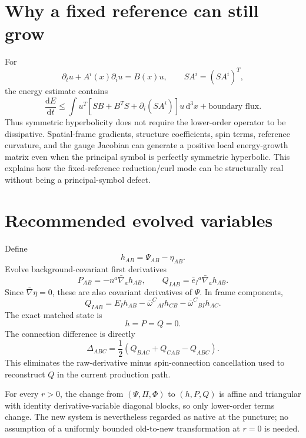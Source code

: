 \documentclass[11pt]{article}
\newcommand{\bn}{\bar\nabla}
\newcommand{\be}{\bar e}
\newcommand{\bw}{\bar\omega}
\newcommand{\dd}{\mathrm d}
\begin{document}
\section{Why a fixed reference can still grow}
For
\[
\partial_tu+A^i(x)\partial_i u=B(x)u,\qquad SA^i=(SA^i)^T,
\]
the energy estimate contains
\begin{equation}
\frac{\dd E}{\dd t}\le
\int u^T\left[SB+B^TS+\partial_i(SA^i)\right]u\,\dd^3x+\text{boundary flux}.
\label{eq:energy}
\end{equation}
Thus symmetric hyperbolicity does not require the lower-order operator to be dissipative. Spatial-frame gradients, structure coefficients, spin terms, reference curvature, and the gauge Jacobian can generate a positive local energy-growth matrix even when the principal symbol is perfectly symmetric hyperbolic. This explains how the fixed-reference reduction/curl mode can be structurally real without being a principal-symbol defect.

\section{Recommended evolved variables}
Define
\begin{equation}
\boxed{h_{AB}=\Psi_{AB}-\eta_{AB}.}
\end{equation}
Evolve background-covariant first derivatives
\begin{equation}
\boxed{P_{AB}=-n^a\bn_a h_{AB},\qquad Q_{IAB}=\be_I{}^a\bn_a h_{AB}.}
\label{eq:variables}
\end{equation}
Since $\bn\eta=0$, these are also covariant derivatives of $\Psi$. In frame components,
\begin{equation}
Q_{IAB}=E_Ih_{AB}-\bw^C{}_{AI}h_{CB}-\bw^C{}_{BI}h_{AC}.
\label{eq:Qdef}
\end{equation}
The exact matched state is
\[
\boxed{h=P=Q=0.}
\]
The connection difference is directly
\begin{equation}
\Delta_{ABC}=\frac12\left(Q_{BAC}+Q_{CAB}-Q_{ABC}\right).
\label{eq:Delta}
\end{equation}
This eliminates the raw-derivative minus spin-connection cancellation used to reconstruct $Q$ in the current production path.

For every $r>0$, the change from $(\Psi,\Pi,\Phi)$ to $(h,P,Q)$ is affine and triangular with identity derivative-variable diagonal blocks, so only lower-order terms change. The new system is nevertheless regarded as native at the puncture; no assumption of a uniformly bounded old-to-new transformation at $r=0$ is needed.
\end{document}
